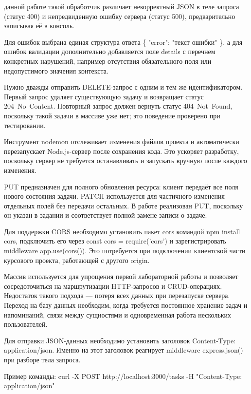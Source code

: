 \documentclass{stp}
\begin{document}
\begin{stpnum}
    данной работе такой обработчик различает некорректный JSON в
    теле запроса (статус 400) и непредвиденную ошибку сервера
    (статус 500), предварительно записывая её в консоль.
  \item Для ошибок выбрана единая структура ответа
    \{ "error": "текст ошибки" \}, а для ошибок валидации
    дополнительно добавляется поле details с перечнем
    конкретных нарушений, например отсутствия обязательного поля или
    недопустимого значения контекста.
  \item Нужно дважды отправить DELETE-запрос с одним и тем же
    идентификатором. Первый запрос удаляет существующую задачу и
    возвращает статус 204~No~Content. Повторный запрос должен
    вернуть статус 404~Not~Found, поскольку такой задачи в массиве
    уже нет; это поведение проверено при тестировании.
  \item Инструмент nodemon отслеживает изменения файлов проекта
    и автоматически перезапускает Node.js-сервер после сохранения
    кода. Это ускоряет разработку, поскольку сервер не требуется
    останавливать и запускать вручную после каждого изменения.
  \item PUT предназначен для полного обновления ресурса: клиент
    передаёт все поля нового состояния задачи. PATCH используется
    для частичного изменения отдельных полей без передачи остальных.
    В работе реализован PUT, поскольку он указан в задании и
    соответствует полной замене записи о задаче.
  \item Для поддержки CORS необходимо установить пакет cors
    командой npm install cors, подключить его через
    const cors = require('cors') и зарегистрировать
    middleware app.use(cors()). Это потребуется при
    подключении клиентской части курсового проекта, работающей с
    другого origin.
  \item Массив используется для упрощения первой лабораторной работы
    и позволяет сосредоточиться на маршрутизации HTTP-запросов и
    CRUD-операциях. Недостаток такого подхода — потеря всех данных
    при перезапуске сервера. Переход на базу данных необходим, когда
    требуется постоянное хранение задач и напоминаний, связи между
    сущностями и одновременная работа нескольких пользователей.
  \item Для отправки JSON-данных необходимо установить заголовок
    Content-Type: application/json. Именно на этот заголовок
    реагирует middleware express.json() при разборе тела
    запроса.
  \item Пример команды: curl -X POST
    http://localhost:3000/tasks -H "Content-Type: application/json"

\end{stpnum}
\end{document}
